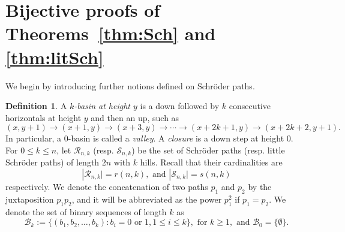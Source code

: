 \documentclass[11pt,reqno]{amsart}
\numberwithin{equation}{section}
\theoremstyle{plain}
\theoremstyle{definition}
\newtheorem{Def}[theorem]{Definition}
\newcommand{\R}{\mathcal{R}}
\newcommand{\s}{\mathcal{S}}
\newcommand{\B}{\mathcal{B}}
\begin{document}
\section{Bijective proofs of Theorems~\ref{thm:Sch} and \ref{thm:litSch}}\label{sec:comb pf}
We begin by introducing further notions defined on Schr\"oder paths.
\begin{Def}\label{further notion}
A \emph{$k$-basin at height $y$} is a down followed by $k$ consecutive horizontals at height $y$ and then an up, such as $$(x,y+1)\rightarrow(x+1,y)\rightarrow(x+3,y)\rightarrow \cdots \rightarrow (x+2k+1,y)\rightarrow(x+2k+2,y+1).$$ In particular, a $0$-basin is called a \emph{valley}. A \emph{closure} is a down step at height $0$. For $0\le k\le n$, let $\R_{n,k}$ (resp. $\s_{n,k}$) be the set of Schr\"oder paths (resp. little Schr\"oder paths) of length $2n$ with $k$ hills. Recall that their cardinalities are
$$|\R_{n,k}\vert=r(n,k), \text{ and } |\s_{n,k}\vert=s(n,k)$$
respectively. We denote the concatenation of two paths $p_1$ and $p_2$ by the juxtaposition $p_1p_2$, and it will be abbreviated as the power $p_1^2$ if $p_1=p_2$. We denote the set of binary sequences of length $k$ as
$$
\B_k:=\{(b_1,b_2,\ldots,b_k):\text{$b_i=0$ or $1$}, 1\le i\le k\}, \text{ for } k\ge 1, \text{ and } \B_0=\{\emptyset\}.
$$
\end{Def}
\end{document}
